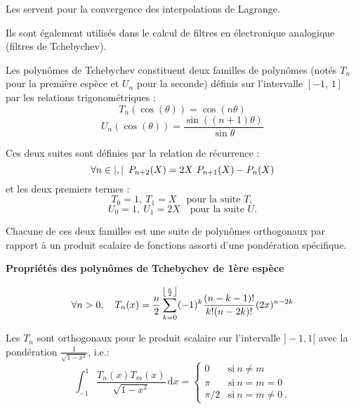 Les  servent pour la convergence des interpolations de Lagrange.

Ils sont également utilisés dans le calcul de filtres en électronique analogique (filtres de Tchebychev).

\medskip
Les polynômes de Tchebychev 
constituent deux familles de polynômes (notés $T_n$ 
pour la première espèce et $U_n$ pour la seconde) définis sur l'intervalle $[-1,\, 1]$ par 
les relations trigonométriques :
\begin{equation}
    T_n(\cos(\theta))=\cos(n\theta)
\end{equation}
\begin{equation}
    U_n(\cos(\theta))=\frac{\sin((n+1) \theta)}{\sin \theta}
\end{equation}

Ces deux suites sont définies par la relation de récurrence :
\begin{equation}
    \forall n\in\left| ,\right|~P_{n+2}(X)=2X~P_{n+1}(X)-P_n(X)
\end{equation}
et les deux premiers termes :
\begin{equation}
    T_0=1,~T_1=X \quad \text{pour la suite } T,
\end{equation}
\begin{equation}
    U_0=1,~U_1=2X \quad \text{pour la suite } U.
\end{equation}

Chacune de ces deux familles est une suite de polynômes orthogonaux 
par rapport à un produit scalaire de fonctions assorti d'une pondération spécifique.

\medskip
\textbf{Propriétés des polynômes de Tchebychev de 1ère espèce}

\begin{equation}
\forall n>0, \quad
    T_n(x)=\dfrac n2\displaystyle\sum_{k=0}^{\left\lfloor \frac n2\right\rfloor}(-1)^k \frac{(n-k-1)!}{k!(n-2k)!}(2x)^{n-2k}
\end{equation}

Les $T_n$ sont orthogonaux pour le produit scalaire sur l'intervalle $]-1,1[$ avec la 
pondération $\frac1{\sqrt{1-x^2}}$, i.e.:
\begin{equation}
    \int_{-1}^1 \frac{T_n(x)T_m(x)}{\sqrt{1-x^2}}\,\mathrm{d}x= \begin{cases} 0&\text{si}~n\ne m\\ \pi&\text{si}~n=m=0\\ \pi/2&\text{si}~n=m\ne 0~. \end{cases} 
\end{equation}

